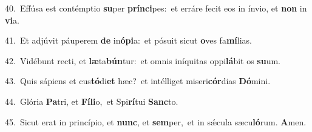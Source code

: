 {\numbfont\textcolor{\numbcolor}{40.}}~Effúsa est contémptio \textbf{su}\-per \textbf{prín}\-\textbf{ci}pes:~\star et erráre fecit eos in ínvio, et \textbf{non} in \textbf{vi}\-a.\par
{\numbfont\textcolor{\numbcolor}{41.}}~Et adjúvit páuperem \textbf{de} in\-\textbf{ó}\-\textbf{pi}a:~\star et pósuit sicut \textbf{o}\-ves fa\-\textbf{mí}\-lias.\par
{\numbfont\textcolor{\numbcolor}{42.}}~Vidébunt recti, et \textbf{læ}\-ta\-\textbf{bún}\-tur:~\star et omnis iníquitas oppi\-\textbf{lá}\-bit os \textbf{su}\-um.\par
{\numbfont\textcolor{\numbcolor}{43.}}~Quis sápiens et cus\-\textbf{tó}\-di\textbf{et} hæc?~\star et intélliget miseri\-\textbf{cór}\-dias \textbf{Dó}\-mini.\par
{\numbfont\textcolor{\numbcolor}{44.}}~Glória \textbf{Pa}\-tri, et \textbf{Fí}\-\textbf{li}o,~\star et Spi\-\textbf{rí}\-tui \textbf{Sanc}\-to.\par
{\numbfont\textcolor{\numbcolor}{45.}}~Sicut erat in princípio, et \textbf{nunc}\-, et \textbf{sem}\-per,~\star et in sǽcula sæcu\-\textbf{ló}\-rum. \textbf{A}\-men.\par
